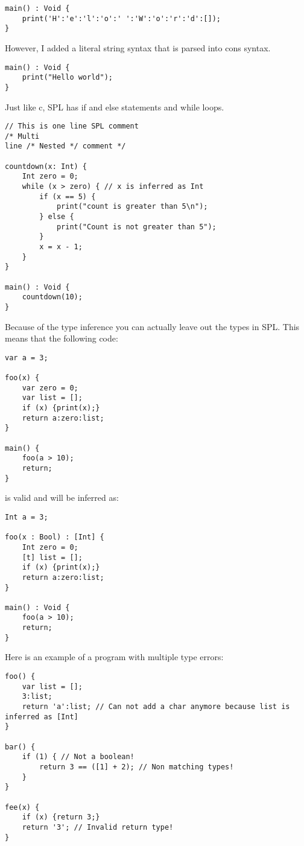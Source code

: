\documentclass{report}
\begin{document}
\begin{lstlisting}[style=SPL]
main() : Void {
    print('H':'e':'l':'o':' ':'W':'o':'r':'d':[]); 
}
\end{lstlisting}

However, I added a literal string syntax that is parsed into cons syntax.

\begin{lstlisting}[style=SPL]
main() : Void {
    print("Hello world"); 
}
\end{lstlisting}

Just like c, SPL has if and else statements and while loops.

\begin{lstlisting}[style=SPL]
// This is one line SPL comment
/* Multi  
line /* Nested */ comment */

countdown(x: Int) {
    Int zero = 0;
    while (x > zero) { // x is inferred as Int 
        if (x == 5) {
            print("count is greater than 5\n");
        } else {
            print("Count is not greater than 5");
        }
        x = x - 1; 
    }
}

main() : Void {
    countdown(10); 
}
\end{lstlisting}

\noindent Because of the type inference you can actually leave out the types in SPL. 
This means that the following code:

\begin{lstlisting}[style=SPL]
var a = 3;

foo(x) {
    var zero = 0;
    var list = [];
    if (x) {print(x);}
    return a:zero:list;
}

main() {
    foo(a > 10);
    return;
}
\end{lstlisting}

\noindent is valid and will be inferred as:

\begin{lstlisting}[style=SPL]
Int a = 3;

foo(x : Bool) : [Int] {
    Int zero = 0;
    [t] list = [];
    if (x) {print(x);}
    return a:zero:list;
}

main() : Void {
    foo(a > 10);
    return;
}
\end{lstlisting}

\noindent Here is an example of a program with multiple type errors:

\begin{lstlisting}[style=SPL]
foo() {
    var list = [];
    3:list;
    return 'a':list; // Can not add a char anymore because list is inferred as [Int]
}

bar() {
    if (1) { // Not a boolean!
        return 3 == ([1] + 2); // Non matching types!
    }
}

fee(x) {
    if (x) {return 3;}
    return '3'; // Invalid return type!
}
\end{lstlisting}
\end{document}
